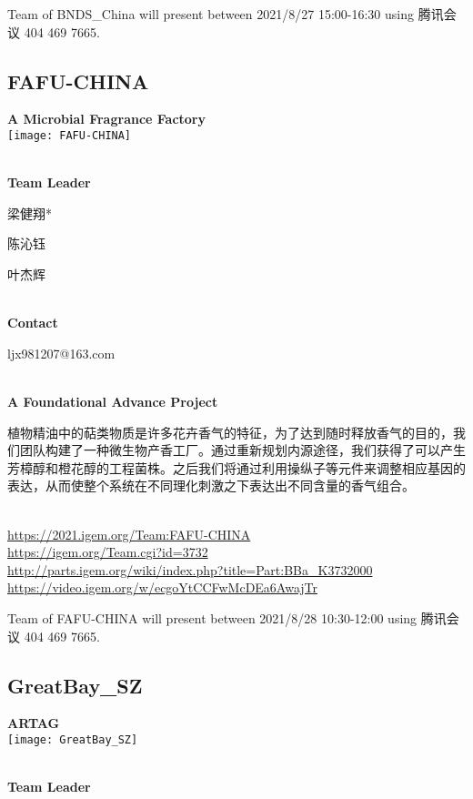 Team of BNDS\_China will present between  2021/8/27 15:00-16:30       using 腾讯会议 404 469 7665.
\newpage


\subsection{\textcolor{Blu}{ FAFU-CHINA } }
\vspace{5mm}
\begin{center}
\large{
  \textbf{ A Microbial Fragrance Factory }\\
  \texttt{[image: FAFU-CHINA]}
}
\end{center}
\textbf{\\Team Leader}

  梁健翔*

  陈沁钰

  叶杰辉


\textbf{\\Contact}

  ljx981207@163.com


\textbf{\\A Foundational Advance Project\\}\begin{spacing}{1.5}

植物精油中的萜类物质是许多花卉香气的特征，为了达到随时释放香气的目的，我们团队构建了一种微生物产香工厂。通过重新规划内源途径，我们获得了可以产生芳樟醇和橙花醇的工程菌株。之后我们将通过利用操纵子等元件来调整相应基因的表达，从而使整个系统在不同理化刺激之下表达出不同含量的香气组合。\end{spacing}
\\

\url{https://2021.igem.org/Team:FAFU-CHINA }\\
\url{https://igem.org/Team.cgi?id=3732 }\\
\url{http://parts.igem.org/wiki/index.php?title=Part:BBa_K3732000 }\\
\url{https://video.igem.org/w/ecgoYtCCFwMcDEa6AwajTr }\\

\vfill{}









Team of FAFU-CHINA will present between     2021/8/28 10:30-12:00    using 腾讯会议 404 469 7665.
\newpage


\subsection{\textcolor{Blu}{ GreatBay\_SZ } }
\vspace{5mm}
\begin{center}
\large{
  \textbf{ ARTAG }\\
  \texttt{[image: GreatBay\_SZ]}
}
\end{center}
\textbf{\\Team Leader}

